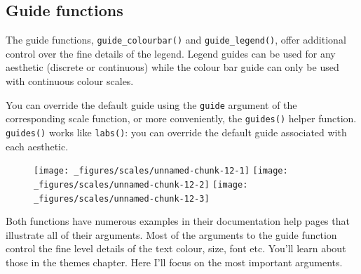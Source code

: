 \subsection{Guide functions}\label{guide-functions}

The guide functions, \texttt{guide\_colourbar()} and
\texttt{guide\_legend()}, offer additional control over the fine details
of the legend. Legend guides can be used for any aesthetic (discrete or
continuous) while the colour bar guide can only be used with continuous
colour scales.

You can override the default guide using the \texttt{guide} argument of
the corresponding scale function, or more conveniently, the
\texttt{guides()} helper function. \texttt{guides()} works like
\texttt{labs()}: you can override the default guide associated with each
aesthetic.

\begin{Shaded}
\begin{Highlighting}[]
\StringTok{ }\NormalTok{(} \NormalTok{, } \NormalTok{:}\NormalTok{, } \NormalTok{:}\NormalTok{)}
\StringTok{ }\StringTok{ }\NormalTok{(}\NormalTok{(} 
\StringTok{ }\NormalTok{(} \NormalTok{())}
\StringTok{ }\NormalTok{(} \NormalTok{())}
\end{Highlighting}
\end{Shaded}

\begin{figure}[H]
  \texttt{[image: \_figures/scales/unnamed-chunk-12-1]}%
  \texttt{[image: \_figures/scales/unnamed-chunk-12-2]}%
  \texttt{[image: \_figures/scales/unnamed-chunk-12-3]}
\end{figure}

Both functions have numerous examples in their documentation help pages
that illustrate all of their arguments. Most of the arguments to the
guide function control the fine level details of the text colour, size,
font etc. You'll learn about those in the themes chapter. Here I'll
focus on the most important arguments.

